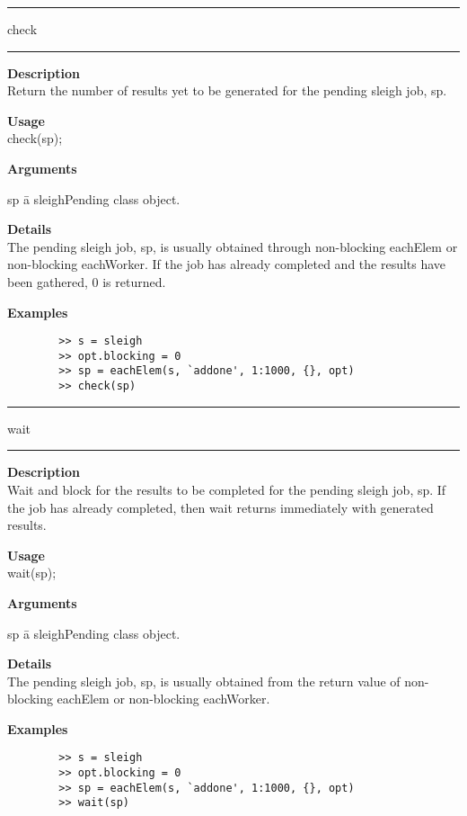 \rule[0.06in]{6in}{0.01in}
\newline
check
\newline
\rule{6in}{0.01in}
\begin{list}{}{}
	\item {\bf Description}\\
    Return the number of results yet to be generated for the pending sleigh job, sp. 
	\item {\bf Usage}\\
	check(sp);
	\item {\bf Arguments}
		\begin{tabbing}
		sp \hspace{2.5cm} \= a sleighPending class object.
		\end{tabbing}
	\item {\bf Details}\\
	The pending sleigh job, sp, is usually obtained through non-blocking eachElem or non-blocking eachWorker. 
	If the job has already completed and the results have been gathered, 0 is returned. 
	\item {\bf Examples}
		\begin{verbatim}
		>> s = sleigh
		>> opt.blocking = 0
		>> sp = eachElem(s, `addone', 1:1000, {}, opt)
		>> check(sp)
		\end{verbatim}
\end{list}

\rule[0.06in]{6in}{0.01in}
\newline
wait
\newline
\rule{6in}{0.01in}
\begin{list}{}{}
	\item {\bf Description}\\
    Wait and block for the results to be completed for the pending sleigh job, sp. 
    If the job has already completed, then wait returns immediately with generated results. 
	\item {\bf Usage}\\
	wait(sp);
	\item {\bf Arguments}
		\begin{tabbing}
		sp \hspace{2.5cm} \= a sleighPending class object.
		\end{tabbing}
	\item {\bf Details}\\
	The pending sleigh job, sp, is usually obtained from the return value of non-blocking eachElem or non-blocking eachWorker. 
	\item {\bf Examples}
		\begin{verbatim}
		>> s = sleigh
		>> opt.blocking = 0
		>> sp = eachElem(s, `addone', 1:1000, {}, opt)
		>> wait(sp)
		\end{verbatim}
\end{list}
